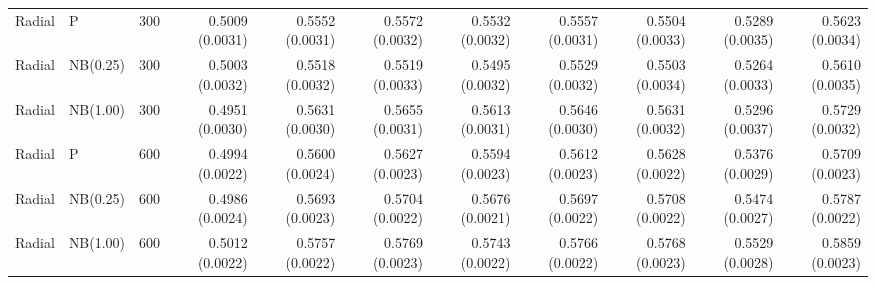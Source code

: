 \begin{table}[p]
{\begin{tabular}{lllrrrrrrrr}
\hline
Radial & P & 300 & 0.5009 (0.0031) & 0.5552 (0.0031) & 0.5572 (0.0032) & 0.5532 (0.0032) & 0.5557 (0.0031) & 0.5504 (0.0033) & 0.5289 (0.0035) & 0.5623 (0.0034) \\
Radial & NB(0.25) & 300 & 0.5003 (0.0032) & 0.5518 (0.0032) & 0.5519 (0.0033) & 0.5495 (0.0032) & 0.5529 (0.0032) & 0.5503 (0.0034) & 0.5264 (0.0033) & 0.5610 (0.0035) \\
Radial & NB(1.00) & 300 & 0.4951 (0.0030) & 0.5631 (0.0030) & 0.5655 (0.0031) & 0.5613 (0.0031) & 0.5646 (0.0030) & 0.5631 (0.0032) & 0.5296 (0.0037) & 0.5729 (0.0032) \\
Radial & P & 600 & 0.4994 (0.0022) & 0.5600 (0.0024) & 0.5627 (0.0023) & 0.5594 (0.0023) & 0.5612 (0.0023) & 0.5628 (0.0022) & 0.5376 (0.0029) & 0.5709 (0.0023) \\
Radial & NB(0.25) & 600 & 0.4986 (0.0024) & 0.5693 (0.0023) & 0.5704 (0.0022) & 0.5676 (0.0021) & 0.5697 (0.0022) & 0.5708 (0.0022) & 0.5474 (0.0027) & 0.5787 (0.0022) \\
Radial & NB(1.00) & 600 & 0.5012 (0.0022) & 0.5757 (0.0022) & 0.5769 (0.0023) & 0.5743 (0.0022) & 0.5766 (0.0022) & 0.5768 (0.0023) & 0.5529 (0.0028) & 0.5859 (0.0023) \\
\hline
\end{tabular}%
}
\end{table}
